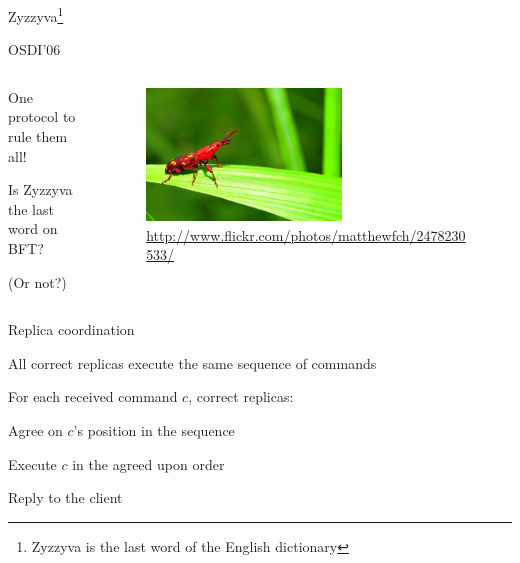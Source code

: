 \begin{frame}{Zyzzyva\footnote{Zyzzyva is the last word of the English dictionary}}
	
\begin{block}{OSDI'06}
{\small
{}
}
\end{block}	
	
\begin{columns}
\begin{column}{0.4\textwidth}
\BIL
\item One protocol to rule them all!
\item Is Zyzzyva the last word on BFT?
\item (Or not?)
\EIL
\end{column}
\begin{column}{0.6\textwidth}
\begin{figure}
	\includegraphics[width=0.6\textwidth]{figs/17/zyzzyva.png}\\
	{\tiny \url{http://www.flickr.com/photos/matthewfch/2478230533/}}
\end{figure}
\end{column}
\end{columns}

\end{frame}

\begin{frame}{Replica coordination}

\BIL
\item All correct replicas execute the same sequence of commands
\item For each received command $c$, correct replicas: 
\BI
\item Agree on $c$'s position in the sequence 
\item Execute $c$ in the agreed upon order 
\item Reply to the client	
\EI
\EIL

\end{frame}


